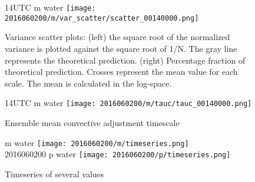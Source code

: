 \documentclass[a4paper, 12pt, draft]{article}
\begin{document}
\begin{figure}[ht] \label{fig:case1_var_scatter}
\noindent {} 14UTC m water
\texttt{[image: 2016060200/m/var\_scatter/scatter\_00140000.png]}\\
\caption{Variance scatter plots: (left) the square root of the normalized variance is plotted against the square root of 1/N. The gray line represents the theoretical prediction. (right) Percentage fraction of theoretical prediction. Crosses represent the mean value for each scale. The mean is calculated in the log-space.}
\end{figure}

\begin{figure}[ht] \label{fig:case1_tau_c}
\noindent {} 14UTC m water
\texttt{[image: 2016060200/m/tauc/tauc\_00140000.png]}\\
\caption{Ensemble mean convective adjustment timescale}
\end{figure}

\begin{figure}[ht] \label{fig:case1_timeseries}
\noindent {} m water
\texttt{[image: 2016060200/m/timeseries.png]}\\
2016060200 p water
\texttt{[image: 2016060200/p/timeseries.png]}\\
\caption{Timeseries of several values}
\end{figure}
\end{document}
